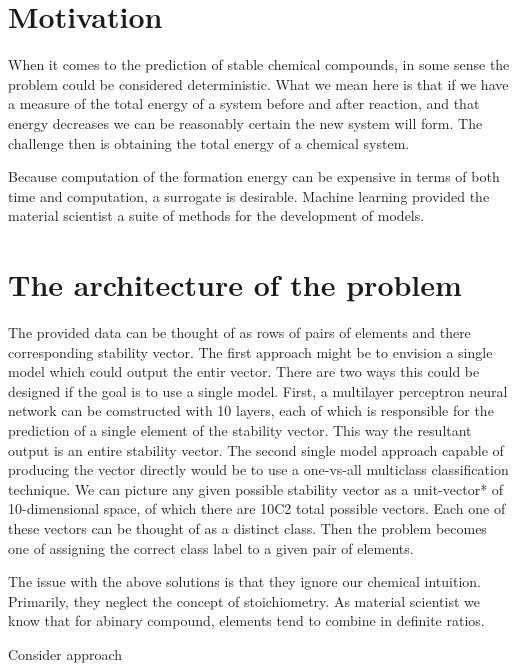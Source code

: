 \section{Motivation}


When it comes to the prediction of stable chemical compounds,
in some sense the problem could be considered deterministic. What
we mean here is that if we have a measure of the total energy of a 
system before and after reaction, and that energy decreases we can
be reasonably certain the new system will form. The challenge then
is obtaining the total energy of a chemical system.

Because computation of the formation energy can be expensive in
terms of both time and computation, a surrogate is desirable. Machine
learning provided the material scientist a suite of methods for
the development of models.


\section{The architecture of the problem}


The provided data can be thought of as rows of pairs of elements and
there corresponding stability vector. The first approach might be to
envision a single model which could output the entir vector. There 
are two ways this could be designed if the goal is to use a single model.
First, a multilayer perceptron neural network can be comstructed with
10 layers, each of which is responsible for the prediction of a single
element of the stability vector. This way the resultant output is an
entire stability vector. The second single model approach capable of
producing the vector directly would be to use a one-vs-all multiclass
classification technique. We can picture any given possible stability
vector as a unit-vector* of 10-dimensional space, of which there are
10C2 total possible vectors. Each one of these vectors can be thought
of as a distinct class. Then the problem becomes one of assigning the
correct class label to a given pair of elements.

The issue with the above solutions is that they ignore our chemical
intuition. Primarily, they neglect the concept of stoichiometry. As
material scientist we know that for  abinary compound, elements tend
to combine in definite ratios. 

Consider approach 